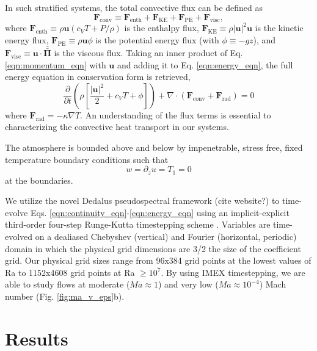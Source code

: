 \documentclass[aps, prl, twocolumn, groupedaddress, amsfonts, amssymb, amsmath]{revtex4-1}
\newcommand{\Div}[1]{\ensuremath{\nabla\cdot\left( #1\right)}}
\newcommand{\grad}{\ensuremath{\nabla}}
\newcommand{\stressT}{\ensuremath{\bm{\bar{\bar{\Pi}}}}}
\begin{document}
In such stratified systems, the total convective flux can be defined as
\begin{equation}
\bm{F}_{\text{conv}} \equiv \bm{F}_{\text{enth}} + \bm{F}_{\text{KE}} + \bm{F}_{\text{PE}} + \bm{F}_{\text{visc}},
\end{equation}
where $\bm{F}_{\text{enth}} \equiv \rho\bm{u}(c_V T + P/\rho)$ is the enthalpy flux, $\bm{F}_{\text{KE}} \equiv 
\rho|\bm{u}|^2\bm{u}$ is the kinetic energy flux, $\bm{F}_{\text{PE}} \equiv \rho\bm{u}\phi$ is the potential
energy flux (with $\phi \equiv -gz$), 
and $\bm{F}_{\text{visc}} \equiv \bm{u}\cdot\stressT$ is the viscous flux.  Taking an inner product of
Eq. \ref{eqn:momentum_eqn} with $\bm{u}$ and adding it to 
Eq. \ref{eqn:energy_eqn}, the full energy equation in conservation form is retrieved,
\begin{equation}
\frac{\partial}{\partial t}\left(\rho\left[\frac{|\bm{u}|^2}{2} + c_V T + \phi\right]\right) +
\Div{\bm{F}_{\text{conv}} + \bm{F}_{\text{rad}}} = 0
	\label{eqn:energy_eqn_full}
\end{equation}
where $\bm{F}_{\text{rad}} = -\kappa \grad T$.  An understanding of the flux terms is essential to characterizing
the convective heat transport in our systems.

The atmosphere is bounded above
and below by impenetrable, stress free, fixed temperature boundary conditions such that
\begin{equation}
w = \partial_z u = T_1 = 0
\end{equation}
at the boundaries. 


We utilize the novel Dedalus pseudospectral framework (cite website?) to time-evolve Eqs. 
\ref{eqn:continuity_eqn}-\ref{eqn:energy_eqn} using an implicit-explicit third-order four-step 
Runge-Kutta timestepping scheme \cite{ascher&all1997}.  
Variables are time-evolved on a dealiased Chebyshev (vertical)
and Fourier (horizontal, periodic) domain in which the
physical grid dimensions are 3/2 the size of the coefficient grid.  Our physical grid sizes range from
96x384 grid points at the lowest values of Ra to 1152x4608 grid points at Ra $\geq 10^{7}$. 
By using IMEX timestepping, we are able to study flows at moderate ($Ma \approx 1$) and very low ($Ma \approx 10^{-4}$)
Mach number (Fig. \ref{fig:ma_v_eps}b).

\section{Results}
\label{sec:results}
\end{document}
